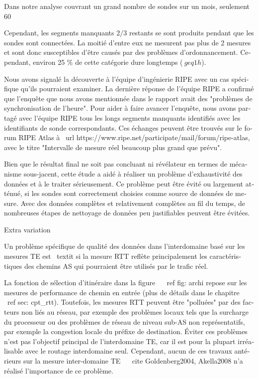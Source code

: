 \begin{otherlanguage}{french}
Dans notre analyse couvrant un grand nombre de sondes sur un mois, seulement 60%

Cependant, les segments manquants $ 2/3 $ restants se sont produits pendant que les sondes sont connectées.
La moitié d'entre eux ne mesurent pas plus de 2 mesures et sont donc susceptibles d'être causés par des problèmes d'ordonnancement. Cependant, environ 25 $ \% $ de cette catégorie dure longtemps ($ \ geq 1h $).

Nous avons signalé la découverte à l'équipe d'ingénierie RIPE avec un cas spécifique qu'ils pourraient examiner.
La dernière réponse de l'équipe RIPE a confirmé que l'enquête que nous avons mentionnée dans le rapport avait des "problèmes de synchronisation de l'heure". Pour aider à faire avancer l'enquête, nous avons partagé avec l'équipe RIPE tous les longs segments manquants identifiés avec les identifiants de sonde correspondants. Ces échanges peuvent être trouvés sur le forum RIPE Atlas à \ url {https://www.ripe.net/participate/mail/forum/ripe-atlas}, avec le titre "Intervalle de mesure réel beaucoup plus grand que prévu".

Bien que le résultat final ne soit pas concluant ni révélateur en termes de mécanisme sous-jacent, cette étude a aidé à réaliser un problème d'exhaustivité des données et à le traiter sérieusement.
Ce problème peut être évité ou largement atténué, si les sondes sont correctement choisies comme source de données de mesure.
Avec des données complètes et relativement complètes au fil du temps, de nombreuses étapes de nettoyage de données peu justifiables peuvent être évitées.

Extra variation

Un problème spécifique de qualité des données dans l'interdomaine basé sur les mesures TE est \ textit {si la mesure RTT reflète principalement les caractéristiques des chemins AS qui pourraient être utilisés par le trafic réel}.

La fonction de sélection d'itinéraire dans la figure ~ \ ref {fig: archi} repose sur les mesures de performance de chemin en entrée (plus de détails dans le chapitre ~ \ ref {sec: cpt_rtt}).
Toutefois, les mesures RTT peuvent être "polluées" par des facteurs non liés au réseau, par exemple des problèmes locaux tels que la surcharge du processeur ou des problèmes de réseau de niveau sub-AS non représentatifs, par exemple la congestion locale du préfixe de destination.
Éviter ces problèmes n'est pas l'objectif principal de l'interdomaine TE, car il est pour la plupart irréalisable avec le routage interdomaine seul.
Cependant, aucun de ces travaux antérieurs sur la mesure inter-domaine TE ~ \ cite {Goldenberg2004, Akella2008} n'a réalisé l'importance de ce problème.


\end{otherlanguage}

